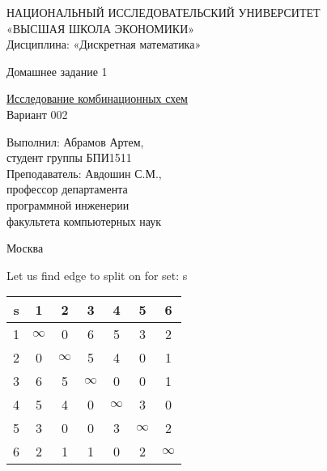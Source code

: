 \documentclass[a4paper,10pt]{report} %
\begin{document}
\begin{titlepage}
\newpage

\begin{center}
{\large НАЦИОНАЛЬНЫЙ ИССЛЕДОВАТЕЛЬСКИЙ УНИВЕРСИТЕТ \\
«ВЫСШАЯ ШКОЛА ЭКОНОМИКИ» 							\\
Дисциплина: «Дискретная математика»}

\vfill %

{\large Домашнее задание 1}

\bigskip

\underline{Исследование комбинационных схем}\\
Вариант 002

\vfill

\begin{flushright}
Выполнил: Абрамов Артем,\\
студент группы БПИ1511\medskip \\
Преподаватель: Авдошин С.М., \\
профессор департамента \\
программной инженерии \\
факультета компьютерных наук
\end{flushright}

\vfill

Москва \number\year

\end{center}
\end{titlepage}



\captionsetup{justification=raggedright,
singlelinecheck=false
}

\captionsetup[subfloat]{labelformat=empty}


Let us find edge to split on for set: s\\
\begin{flushleft}\begin{tabular}[]{|c|c|c|c|c|c|c|}
\hline
s & 1 & 2 & 3 & 4 & 5 & 6\\
\hline
1 & $\infty$ &      0 &      6 &      5 &      3 &      2\\
\hline
2 &      0 & $\infty$ &      5 &      4 &      0 &      1\\
\hline
3 &      6 &      5 & $\infty$ &      0 &      0 &      1\\
\hline
4 &      5 &      4 &      0 & $\infty$ &      3 &      0\\
\hline
5 &      3 &      0 &      0 &      3 & $\infty$ &      2\\
\hline
6 &      2 &      1 &      1 &      0 &      2 & $\infty$\\
\hline
\end{tabular}
\end{flushleft}
\end{document}
